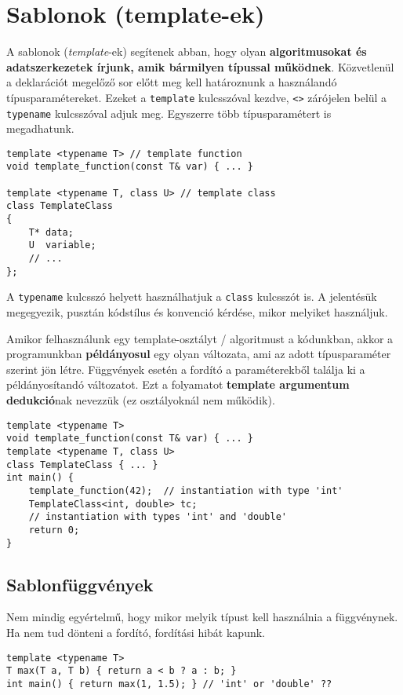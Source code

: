 \documentclass[a4paper, 11pt, oneside]{book}
\begin{document}
\section{Sablonok (template-ek)}

A sablonok (\textit{template}-ek) segítenek abban, hogy olyan \textbf{algoritmusokat és adatszerkezetek írjunk, amik bármilyen típussal működnek}. Közvetlenül a deklarációt megelőző sor előtt meg kell határoznunk a használandó típusparamétereket. Ezeket a \verb*|template| kulcsszóval kezdve, \verb*|<>| zárójelen belül a \verb*|typename| kulcsszóval adjuk meg. Egyszerre több típusparamétert is megadhatunk.

\begin{lstlisting}[style=cppstyle]
template <typename T> // template function
void template_function(const T& var) { ... }

template <typename T, class U> // template class
class TemplateClass
{
	T* data;
	U  variable;
	// ...
};
\end{lstlisting}

A \verb*|typename| kulcsszó helyett használhatjuk a \verb*|class| kulcsszót is. A jelentésük megegyezik, pusztán kódstílus és konvenció kérdése, mikor melyiket használjuk.

Amikor felhasználunk egy template-osztályt / algoritmust a kódunkban, akkor a programunkban \textbf{példányosul} egy olyan változata, ami az adott típusparaméter szerint jön létre. Függvények esetén a fordító a paraméterekből találja ki a példányosítandó változatot. Ezt a folyamatot \textbf{template argumentum dedukció}nak nevezzük (ez osztályoknál nem működik). 

\begin{lstlisting}[style=cppstyle]
template <typename T>
void template_function(const T& var) { ... }	
template <typename T, class U>
class TemplateClass { ... }	
int main() {
	template_function(42);	// instantiation with type 'int'
	TemplateClass<int, double> tc; 
	// instantiation with types 'int' and 'double'
	return 0;
}
\end{lstlisting}

\subsection{Sablonfüggvények}

Nem mindig egyértelmű, hogy mikor melyik típust kell használnia a függvénynek. Ha nem tud dönteni a fordító, fordítási hibát kapunk.

\begin{lstlisting}[style=cppstyle]
template <typename T>
T max(T a, T b) { return a < b ? a : b; }
int main() { return max(1, 1.5); } // 'int' or 'double' ??
\end{lstlisting}
\end{document}
